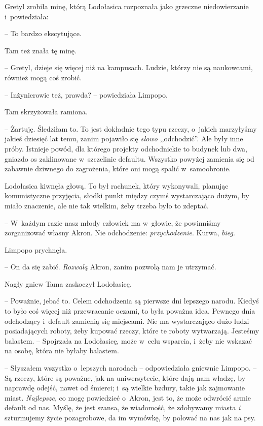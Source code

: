 \documentclass[oneside,polish,11pt,sfheadings]{mwbk}
\begin{document}
Gretyl zrobiła minę, którą Lodołasica rozpoznała jako grzeczne
niedowierzanie i~powiedziała: 

-- To bardzo ekscytujące.

Tam też znała tę minę. 

-- Gretyl, dzieje się więcej niż na kampusach.
Ludzie, którzy nie są naukowcami, również mogą coś zrobić.

-- Inżynierowie też, prawda? -- powiedziała Limpopo.

Tam skrzyżowała ramiona.

-- Żartuję. Śledziłam to. To jest dokładnie tego typu rzeczy, o~jakich
marzyłyśmy jakieś dziesięć lat temu, zanim pojawiło się \textit{słowo}
,,odchodzić''. Ale były inne próby. Istnieje powód, dla którego projekty
odchodnickie to budynek lub dwa, gniazdo os zaklinowane w~szczelinie
defaultu. Wszystko powyżej zamienia się od zabawnie dziwnego do
zagrożenia, które oni mogą spalić w~samoobronie.

Lodołasica kiwnęła głową. To był rachunek, który wykonywali, planując
komunistyczne przyjęcia, słodki punkt między czymś wystarczająco dużym,
by miało znaczenie, ale nie tak wielkim, żeby trzeba było to zdeptać.

-- W~każdym razie nasz młody człowiek ma w~głowie, że powinniśmy
zorganizować własny Akron. Nie odchodzenie: \textit{przychodzenie}. Kurwa,
\textit{bieg}.

Limpopo prychnęła. 

-- On da się zabić. \textit{Rozwalą }Akron, zanim
pozwolą nam je utrzymać.

Nagły gniew Tama zaskoczył Lodołasicę. 

-- Poważnie, jebać to. Celem
odchodzenia są pierwsze dni lepszego narodu. Kiedyś to było coś więcej
niż przewracanie oczami, to była poważna idea. Pewnego dnia odchodzący i~default zamienią się miejscami. Nie ma wystarczająco dużo ludzi
posiadających roboty, żeby kupować rzeczy, które te roboty wytwarzają.
Jesteśmy balastem. -- Spojrzała na Lodołasicę, może w~celu wsparcia, i~żeby nie wskazać na osobę, która nie byłaby balastem.

-- Słyszałem wszystko o~lepszych narodach -- odpowiedziała gniewnie
Limpopo. -- Są rzeczy, które są poważne, jak na uniwersytecie, które dają
nam władzę, by naprawdę odejść, nawet od śmierci; i~są wielkie bzdury,
takie jak zajmowanie miast. \textit{Najlepsze}, co mogę powiedzieć o~Akron, jest to, że może odwrócić armie default od nas. Myślę, że jest
szansa, że wiadomość, że zdobywamy miasta \textit{i} szturmujemy życie
pozagrobowe, da im wymówkę, by polować na nas jak na psy.
\end{document}
